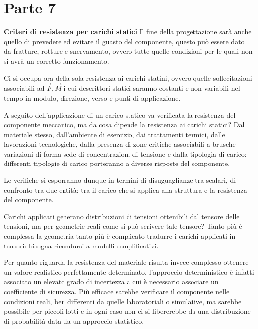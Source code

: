 \documentclass{article}
\def\outcome{\textbf{Learning Outcomes:} Outcomes go here. }
\begin{document}
	\section*{Parte 7} %

\begin{adjustwidth}{2in}{}  
	
\textbf{{\Large Criteri di resistenza per carichi statici}} \mbox{} \newline
		Il fine della progettazione sarà anche quello di prevedere ed evitare il guasto del componente, questo può essere dato da fratture, rotture e snervamento, ovvero tutte quelle condizioni per le quali non si avrà un corretto funzionamento. \newline 
		
		Ci si occupa ora della sola resistenza ai carichi statini, ovvero quelle sollecitazioni associabili ad $\vec{F}, \vec{M}$ i cui descrittori statici saranno costanti e non variabili nel tempo in modulo, direzione, verso e punti di applicazione. \newline 
		
		A seguito dell'applicazione di un carico statico va verificata la resistenza del componente meccanico, ma da cosa dipende la resistenza ai carichi statici? Dal materiale stesso, dall'ambiente di esercizio, dai trattamenti termici, dalle lavorazioni tecnologiche, dalla presenza di zone critiche associabili a brusche variazioni di forma sede di concentrazioni di tensione e dalla tipologia di carico: differenti tipologie di carico porteranno a diverse risposte del componente. \newline 
		
		Le verifiche si esporranno dunque in termini di disuguaglianze tra scalari, di confronto tra due entità: tra il carico che si applica alla struttura e la resistenza del componente. 
		
		Carichi applicati generano distribuzioni di tensioni ottenibili dal tensore delle tensioni, ma per geometrie reali come si può scrivere tale tensore? Tanto più è complessa la geometria tanto più è complicato tradurre i carichi applicati in tensori: bisogna ricondursi a modelli semplificativi. 
		
		Per quanto riguarda la resistenza del materiale risulta invece complesso ottenere un valore realistico perfettamente determinato, l'approccio deterministico è infatti associato un elevato grado di incertezza a cui è necessario associare un coefficiente di sicurezza. Più efficace sarebbe verificare il componente nelle condizioni reali, ben differenti da quelle laboratoriali o simulative, ma sarebbe possibile per piccoli lotti e in ogni caso non ci si libererebbe da una distribuzione di probabilità data da un approccio statistico. \newline 
		

\end{adjustwidth}
\end{document}
